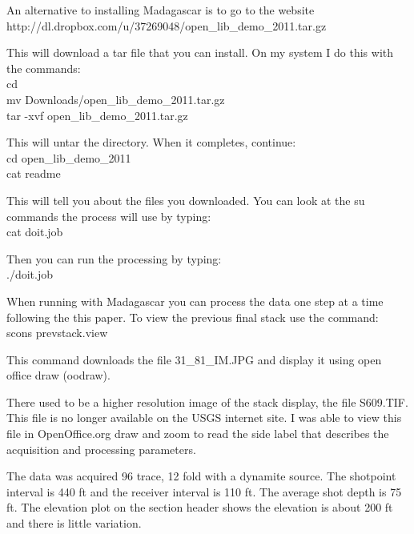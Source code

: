 An alternative to installing Madagascar is to go to the website
http://dl.dropbox.com/u/37269048/open\_lib\_demo\_2011.tar.gz

This will download a tar file that you can install.  On my system I
do this with the commands:\\
cd\\
mv Downloads/open\_lib\_demo\_2011.tar.gz\\
tar -xvf open\_lib\_demo\_2011.tar.gz

This will untar the directory.  When it completes, continue:\\
cd open\_lib\_demo\_2011\\
cat readme

This will tell you about the files you downloaded.  You can look at the 
su commands the process will use by typing:\\
cat doit.job

Then you can run the processing by typing:\\  
./doit.job

When running with Madagascar you can process the data one step at a time 
following the this paper.  To view the previous final stack use the 
command:\\

scons prevstack.view

This command downloads the file 31\_81\_IM.JPG and display it using 
open office draw (oodraw).

There used to be a higher resolution image of the stack display, the 
file S609.TIF.  This file is no longer available on the USGS internet 
site.  I was able to view this file in OpenOffice.org draw 
and zoom to read the side label that describes the acquisition and 
processing parameters.

The data was acquired 96 trace, 12 fold with a dynamite source.  The
shotpoint interval is 440 ft and the receiver interval is 110 ft.  The
average shot depth is 75 ft.  The elevation plot on the section header
shows the elevation is about 200 ft and there is little variation.

